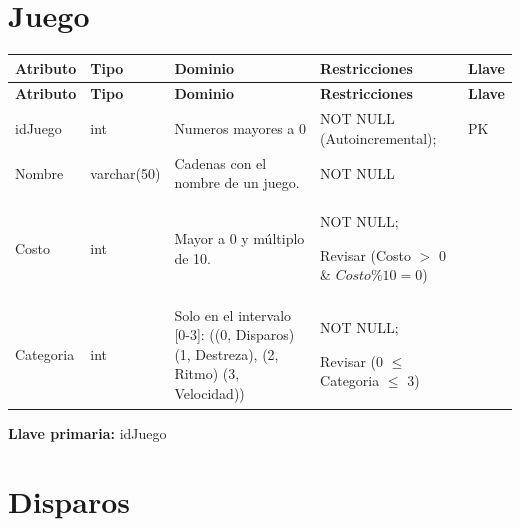 \documentclass[12pt]{article}
\begin{document}
\section*{Juego}

\begin{longtable}{p{3.2cm} p{2.2cm} p{4.8cm} p{4.2cm} p{1.2cm}}
\label{tab:juego}\\
\toprule
\textbf{Atributo} & \textbf{Tipo} & \textbf{Dominio} & \textbf{Restricciones} & \textbf{Llave} \\
\midrule
\endfirsthead

\toprule
\textbf{Atributo} & \textbf{Tipo} & \textbf{Dominio} & \textbf{Restricciones} & \textbf{Llave} \\
\midrule
\endhead

\bottomrule
\endfoot

idJuego 
& int
& Numeros mayores a 0 
& NOT NULL (Autoincremental);
& PK \\

Nombre 
& varchar(50)
& Cadenas con el nombre de un juego.
& NOT NULL 
& \\

Costo 
& int
& Mayor a 0 y múltiplo de 10.
& NOT NULL;

Revisar (Costo $>$ 0 \& $Costo \% 10 = 0$)
& \\

Categoria 
& int
& Solo en el intervalo [0-3]: ((0, Disparos) (1, Destreza), (2, Ritmo) (3, Velocidad))
& NOT NULL;

Revisar (0 $\leq$ Categoria $\leq$ 3)
& \\

\end{longtable}

\vspace{2pt}
\textbf{Llave primaria:} idJuego\\


\section*{Disparos}
\end{document}
